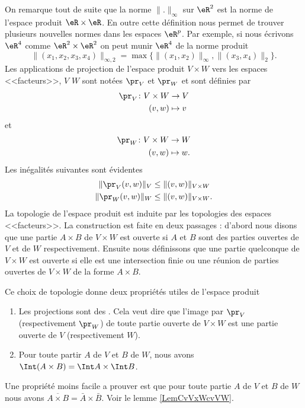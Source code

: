 On remarque tout de suite que la norme $\|.\|_\infty$ sur $\eR^2$ est la norme de l'espace produit $\eR\times\eR$. En outre cette définition nous permet de trouver plusieurs nouvelles normes dans les espaces $\eR^p$. Par exemple, si nous écrivons $\eR^4$ comme $\eR^2\times \eR^2$ on peut munir $\eR^4$ de la norme produit
\[
\|(x_1,x_2,x_3,x_4)\|_{\infty, 2}=\max\{\|(x_1,x_2)\|_\infty, \|(x_3,x_4)\|_2\}. 
\]    
Les applications de projection de l'espace produit $V\times W$ vers les espaces <<facteurs>>, $V$ $W$ sont notées $\pr_V$ et $\pr_W$ et sont définies par
\begin{equation}
	\begin{aligned}
		\pr_V\colon V\times W&\to V \\
		(v,w)&\mapsto v 
	\end{aligned}
\end{equation}
et
\begin{equation}
	\begin{aligned}
		\pr_W\colon V\times W &\to W \\
		(v,w)&\mapsto w. 
	\end{aligned}
\end{equation}
Les inégalités suivantes sont évidentes
\begin{equation}
	\begin{aligned}[]
		\|\pr_V(v,w)\|_V&\leq \|(v,w)\|_{V\times W} \\
		\|\pr_W(v,w)\|_W&\leq \|(v,w)\|_{V\times W}.
	\end{aligned}
\end{equation}
La topologie de l'espace produit est induite par les topologies des espaces <<facteurs>>. La construction est faite en deux passages : d'abord nous disons que une partie $A\times B$ de $V\times W$ est ouverte si $A$ et $B$ sont des parties ouvertes de $V$ et de $W$ respectivement.  Ensuite nous définissons que une partie quelconque de $V\times W$ est ouverte si elle est une intersection finie ou une réunion de parties ouvertes de $V\times W$ de la forme $A\times B$. 

Ce choix de topologie donne deux propriétés utiles de l'espace produit 
\begin{enumerate}
	\item
		Les projections sont des . Cela veut dire que l'image par $\pr_V$ (respectivement $\pr_W$) de toute partie ouverte de $V\times W$ est une partie ouverte de $V$ (respectivement $W$). 
	\item 
		Pour toute partir $A$ de $V$ et $B$ de $W$, nous avons $\Int (A\times B)=\Int A\times \Int B$.\label{PgovlABeqbAbB}
\end{enumerate}
Une propriété moins facile a prouver est que pour toute partie $A$ de $V$ et $B$ de $W$ nous avons  $\overline{A\times B}=\bar{A}\times \bar{B}$. Voir le lemme \ref{LemCvVxWcvVW}.
  
